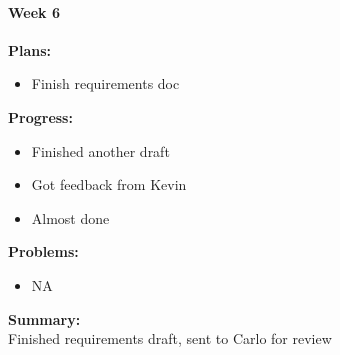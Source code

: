 \paragraph{Week 6}
\begin{adjustwidth}{2.5em}{0pt}
    \vspace{-0.5cm}\textbf{Plans:}
    \vspace{-0.5cm}
    \begin{itemize}
        \item Finish requirements doc
    \end{itemize} 
    \vspace{-0.3cm}\textbf{Progress:}
    \vspace{-0.5cm}
    \begin{itemize}
        \item Finished another draft
        \item Got feedback from Kevin
        \item Almost done
    \end{itemize} 
    \vspace{-0.3cm}\textbf{Problems:}
    \vspace{-0.5cm}
    \begin{itemize}
        \item NA
    \end{itemize}  
    \vspace{-0.3cm}\noindent\textbf{Summary:}\\
    \noindent 
    Finished requirements draft, sent to Carlo for review
\end{adjustwidth} 

